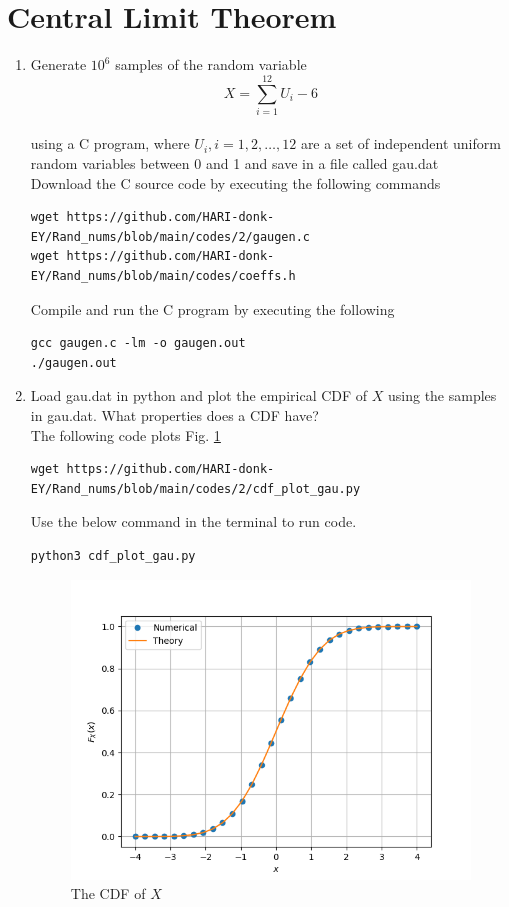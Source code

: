 \documentclass[journal,12pt,twocolumn]{IEEEtran}
\renewcommand\thesection{\arabic{section}}
\begin{document}
\section{Central Limit Theorem}
%
\begin{enumerate}[label=\thesection.\arabic*
,ref=\thesection.\theenumi]

%
\item
Generate $10^6$ samples of the random variable
%
\begin{equation}
X = \sum_{i=1}^{12}U_i -6
\end{equation}\\
%
using a C program, where $U_i, i = 1,2,\dots, 12$ are  a set of independent uniform random variables between 0 and 1
and save in a file called gau.dat\\
\solution Download the C source code by executing the following commands
\begin{lstlisting}
wget https://github.com/HARI-donk-EY/Rand_nums/blob/main/codes/2/gaugen.c
wget https://github.com/HARI-donk-EY/Rand_nums/blob/main/codes/coeffs.h

\end{lstlisting}
Compile and run the C program by executing the following
\begin{lstlisting}
gcc gaugen.c -lm -o gaugen.out
./gaugen.out
\end{lstlisting}
%
\item
Load gau.dat in python and plot the empirical CDF of $X$ using the samples in gau.dat. What properties does a CDF have?
\\
\solution  The following code plots Fig. \ref{fig:gauss_cdf}
\begin{lstlisting}
wget https://github.com/HARI-donk-EY/Rand_nums/blob/main/codes/2/cdf_plot_gau.py
\end{lstlisting}
Use the below command in the terminal to run code.
\begin{lstlisting}
python3 cdf_plot_gau.py
\end{lstlisting}

\begin{figure}
\centering
\includegraphics[width=\columnwidth]{./codes/2/fig/gauss_cdf.png}
\caption{The CDF of $X$}
\label{fig:gauss_cdf}
\end{figure}


\end{enumerate}
\end{document}
